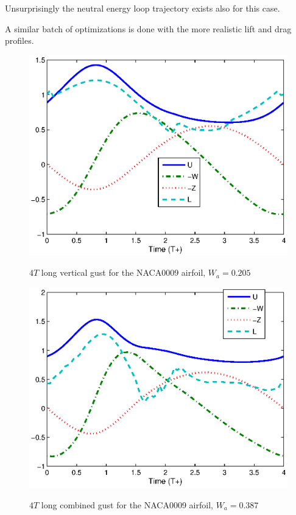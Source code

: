 \FloatBarrier
Unsurprisingly the neutral energy loop trajectory exists also for this case.



\par A similar batch of optimizations is done with the more realistic lift and drag profiles.

\begin{figure}
  \begin{center}
   \scalebox{1.0}
   {\includegraphics{./Figures/Windtype=1_Tg=4_Wg=0p205_UAV_alphamax=12.eps}}
  \end{center}
  \caption{$4T$ long vertical gust for the NACA0009 airfoil, $W_a=0.205$}
  \label{fig:vertical_optimization_UAV}
\end{figure}


\begin{figure}[h]
  \begin{center}
    \scalebox{1.0}
    {\includegraphics{./Figures/Windtype=3_Tg=4_Wg=0p387_UAV_alphamax=12.eps}}
  \end{center}
  \caption{$4T$ long combined gust for the NACA0009 airfoil, $W_a=0.387$}
  \label{fig:combined_optimization_UAV}
\end{figure}

